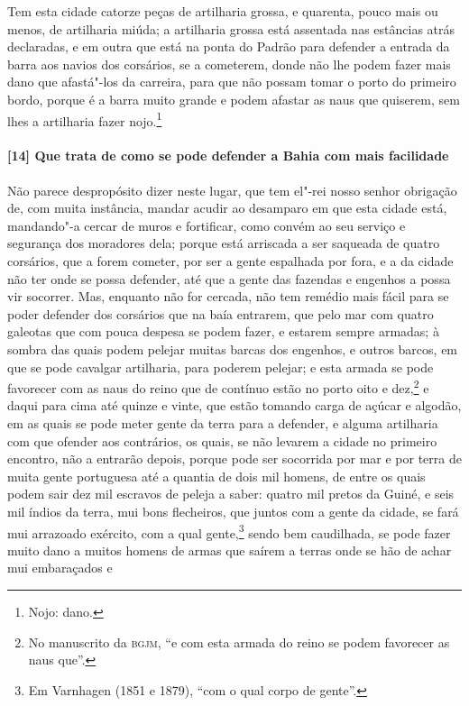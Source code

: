 Tem esta cidade catorze peças de artilharia grossa, e quarenta, pouco mais ou menos, de
artilharia miúda; a artilharia grossa está assentada nas estâncias atrás declaradas, e em
outra que está na ponta do Padrão para defender a entrada da barra aos navios dos
corsários, se a cometerem, donde não lhe podem fazer mais dano que afastá"-los da carreira,
para que não possam tomar o porto do primeiro bordo, porque é a barra muito grande e podem
afastar as naus que quiserem, sem lhes a artilharia fazer nojo.\footnote{ Nojo: dano.}


\paragraph{[14] Que trata de como se pode defender a Bahia com mais facilidade} \quad
Não parece despropósito dizer neste lugar, que tem el"-rei nosso senhor obrigação de, com
muita instância, mandar acudir ao desamparo em que esta cidade está, mandando"-a cercar de
muros e fortificar, como convém ao seu serviço e segurança dos moradores dela; porque está
arriscada a ser saqueada de quatro corsários, que a forem cometer, por ser a gente
espalhada por fora, e a da cidade não ter onde se possa defender, até que a gente das
fazendas e engenhos a possa vir socorrer. Mas, enquanto não for cercada, não tem remédio
mais fácil para se poder defender dos corsários que na baía entrarem, que pelo mar com
quatro galeotas que com pouca despesa se podem fazer, e estarem sempre armadas; à sombra
das quais podem pelejar muitas barcas dos engenhos, e outros barcos, em que se pode
cavalgar artilharia, para poderem pelejar; e esta armada se pode favorecer com as naus do
reino que de contínuo estão no porto oito e dez,\footnote{ No manuscrito da \textsc{bgjm},
``e com esta armada do reino se podem favorecer as naus que''.} e daqui para cima até
quinze e vinte, que estão tomando carga de açúcar e algodão, em as quais se pode meter
gente da terra para a defender, e alguma artilharia com que ofender aos contrários, os
quais, se não levarem a cidade no primeiro encontro, não a entrarão depois, porque pode
ser socorrida por mar e por terra de muita gente portuguesa até a quantia de dois mil
homens, de entre os quais podem sair dez mil escravos de peleja a saber: quatro mil pretos
da Guiné, e seis mil índios da terra, mui bons flecheiros, que juntos com a gente da
cidade, se fará mui arrazoado exército, com a qual gente,\footnote{ Em Varnhagen (1851 e
1879), ``com o qual corpo de gente''.} sendo bem caudilhada, se pode fazer muito dano a
muitos homens de armas que saírem a terras onde se hão de achar mui embaraçados e
